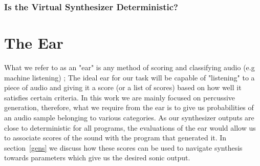 \documentclass[\main/thesis.tex]{subfiles}
\begin{document}
\begin{table}[h!]
\centering
{}
\caption{Synthesizer submodule Parameters. Despite the simplicity of the parameters and our efforts at constraining the ranges, the number of parameters that can be randomly chosen for each submodule is in the order of $10^{15}$ }
\label{table:submodule_params}
\end{table}

\subsubsection{Is the Virtual Synthesizer Deterministic?}
\label{chap3:synth_deterministic}
\section{The Ear}

What we refer to as an "ear" is any method of scoring and classifying audio (e.g machine listening) \cite{malkin2006machine,rowe1992interactive}; The ideal ear for our task will be capable of "listening" to a piece of audio and giving it a score (or a list of scores) based on how well it satisfies certain criteria. In this work we are mainly focused on percussive generation, therefore, what we require from the ear is to give us probabilities of an audio sample belonging to various categories. As our synthesizer outputs are close to deterministic for all programs, the evaluations of the ear would allow us to associate scores of the sound with the program that generated it. In section~\ref{gens} we discuss how these scores can be used to navigate synthesis towards parameters which give us the desired sonic output.
\end{document}
